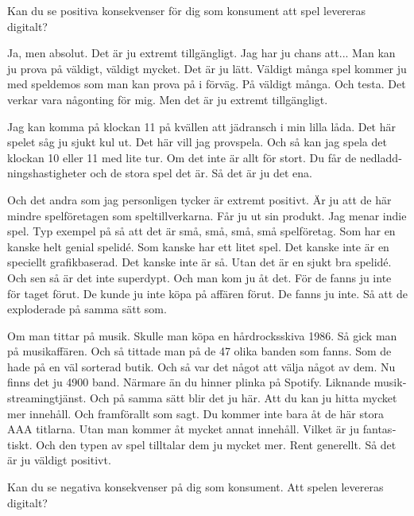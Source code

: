 \documentclass[11p]{article}
\begin{document}
\begin{otherlanguage}{swedish}
        \setlength{\leftskip}{0cm}
        Kan du se positiva konsekvenser för dig som konsument att spel levereras digitalt?


        \setlength{\leftskip}{1cm}

        Ja, men absolut. Det är ju extremt tillgängligt. Jag har ju chans att... Man kan ju prova på väldigt, väldigt mycket. Det är ju lätt.
        Väldigt många spel kommer ju med speldemos som man kan prova på i förväg. På väldigt många. Och testa. Det verkar vara någonting för mig. Men det är ju extremt tillgängligt.

        Jag kan komma på klockan 11 på kvällen att jädransch i min lilla låda. Det här spelet såg ju sjukt kul ut. Det här vill jag provspela. Och så kan jag spela det klockan 10 eller 11 med lite tur. Om det inte är allt för stort. Du får de nedladdningshastigheter och de stora spel det är.
        Så det är ju det ena.

        Och det andra som jag personligen tycker är extremt positivt. Är ju att de här mindre spelföretagen som speltillverkarna. Får ju ut sin produkt.
        Jag menar indie spel. Typ exempel på så att det är små, små, små, små spelföretag. Som har en kanske helt genial spelidé. Som kanske har ett litet spel.
        Det kanske inte är en speciellt grafikbaserad. Det kanske inte är så. Utan det är en sjukt bra spelidé. Och sen så är det inte superdypt. Och man kom ju åt det. För de fanns ju inte för taget förut.
        De kunde ju inte köpa på affären förut. De fanns ju inte. Så att de exploderade på samma sätt som.

        Om man tittar på musik. Skulle man köpa en hårdrocksskiva 1986.
        Så gick man på musikaffären. Och så tittade man på de 47 olika banden som fanns. Som de hade på en väl sorterad butik. Och så var det något att välja något av dem. Nu finns det ju 4900 band.
        Närmare än du hinner plinka på Spotify. Liknande musikstreamingtjänst. Och på samma sätt blir det ju här. Att du kan ju hitta mycket mer innehåll. Och framförallt som sagt. Du kommer inte bara åt de här stora AAA titlarna.
        Utan man kommer åt mycket annat innehåll. Vilket är ju fantastiskt. Och den typen av spel tilltalar dem ju mycket mer. Rent generellt. Så det är ju väldigt positivt.


        \setlength{\leftskip}{0cm}

        Kan du se negativa konsekvenser på dig som konsument. Att spelen levereras digitalt?

        \setlength{\leftskip}{1cm}


\end{otherlanguage}
\end{document}
